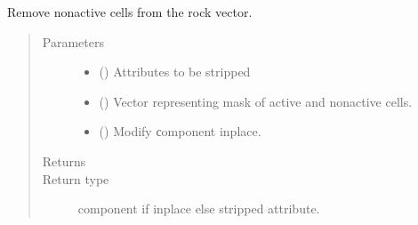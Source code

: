 \documentclass[letterpaper,10pt,english]{sphinxmanual}
\begin{document}
\begin{fulllineitems}
\begin{fulllineitems}
\end{fulllineitems}


\begin{fulllineitems}
\label{\detokenize{api/rock:geology.src.Rock.strip_na}}
Remove non\sphinxhyphen{}active cells from the rock vector.
\begin{quote}\begin{description}
\item[{Parameters}] \leavevmode\begin{itemize}
\item {} 
 (\sphinxstyleliteralemphasis{\sphinxupquote{, }}) \textendash{} Attributes to be stripped

\item {} 
 () \textendash{} Vector representing mask of active and non\sphinxhyphen{}active cells.

\item {} 
 () \textendash{} Modify сomponent inplace.

\end{itemize}

\item[{Returns}] \leavevmode
{}

\item[{Return type}] \leavevmode
component if inplace else stripped attribute.

\end{description}\end{quote}

\end{fulllineitems}



\end{fulllineitems}
\end{document}
